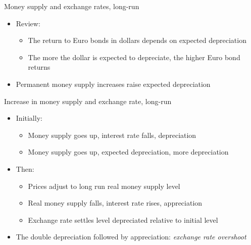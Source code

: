 \documentclass[10pt,hyperref={CJKbookmarks=true},xcolor=dvipsnames,aspectratio=169]{beamer}
\begin{document}


\begin{frame}{Money supply and exchange rates, long-run}
\begin{itemize}
\item Review: 
\begin{itemize}
\item The return to Euro bonds in dollars depends on expected depreciation
\item The more the dollar is expected to depreciate, the higher Euro bond returns
\end{itemize}
\item Permanent money supply increases raise expected depreciation
\end{itemize}
\end{frame}



\begin{frame}{Increase in money supply and exchange rate, long-run}
\begin{itemize}
\item Initially:
\begin{itemize}
\item Money supply goes up, interest rate falls, depreciation
\item Money supply goes up, expected depreciation, more depreciation
\end{itemize}
\item Then:
\begin{itemize}
\item Prices adjust to long run real money supply level
\item Real money supply falls, interest rate rises, appreciation
\item Exchange rate settles level depreciated relative to initial level
\end{itemize}
\item The double depreciation followed by appreciation: \emph{exchange rate overshoot}
\end{itemize}
\end{frame}
\end{document}
